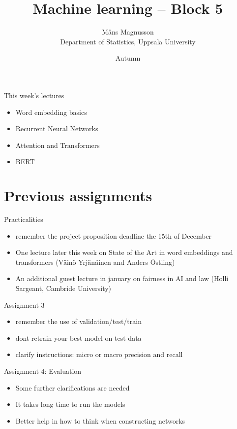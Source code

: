\documentclass[10pt]{beamer}
\title[]{{\color{black}Machine learning -- Block 5}}
\author[]{M{\aa}ns Magnusson\\Department of Statistics, Uppsala University}
\date{Autumn \the\year}
\begin{document}
\frame{\titlepage
}



\begin{frame}{This week's lectures}
\begin{itemize}
\item Word embedding basics
\item Recurrent Neural Networks
\item Attention and Transformers
\item BERT
\end{itemize}
\end{frame}




\section{Previous assignments}

\begin{frame}{Practicalities}

\begin{itemize}
\item remember the project proposition deadline the 15th of December
\item One lecture later this week on State of the Art in word embeddings and transformers (Väinö Yrjänäinen and Anders Östling)
\item An additional guest lecture in january on fairness in AI and law (Holli Sargeant, Cambride University)
\end{itemize}

\end{frame}

\begin{frame}{Assignment 3}

\begin{itemize}
\item remember the use of validation/test/train
\item dont retrain your best model on test data
\item clarify instructions: micro or macro precision and recall
\end{itemize}

\end{frame}

\begin{frame}{Assignment 4: Evaluation}

\begin{itemize}
\item Some further clarifications are needed
\item It takes long time to run the models
\item Better help in how to think when constructing networks
\end{itemize}

\end{frame}
\end{document}
